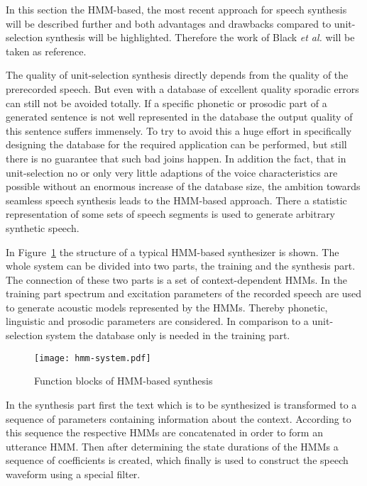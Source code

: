 In this section the \ac{HMM}-based, the most recent approach for speech synthesis will be described further and both advantages and drawbacks compared to unit-selection synthesis will be highlighted. Therefore the work of Black \textit{et al.} \cite{black:statistical} will be taken as reference.

The quality of unit-selection synthesis directly depends from the quality of the prerecorded speech. But even with a database of excellent quality sporadic errors can still not be avoided totally. If a specific phonetic or prosodic part of a generated sentence is not well represented in the database the output quality of this sentence suffers immensely. To try to avoid this a huge effort in specifically designing the database for the required application can be performed, but still there is no guarantee that such bad joins happen. In addition the fact, that in unit-selection no or only very little adaptions of the voice characteristics are possible without an enormous increase of the database size, the ambition towards seamless speech synthesis leads to the \ac{HMM}-based approach. There a statistic representation of some sets of speech segments is used to generate arbitrary synthetic speech.

In Figure~\ref{fig:hmm} the structure of a typical \ac{HMM}-based synthesizer is shown. The whole system can be divided into two parts, the training and the synthesis part. The connection of these two parts is a set of context-dependent \acp{HMM}. In the training part spectrum and excitation parameters %
of the recorded speech are used to generate acoustic models represented by the \acp{HMM}. Thereby phonetic, linguistic and prosodic parameters are considered. In comparison to a unit-selection system the database only is needed in the training part.

\begin{figure}[h]
	\texttt{[image: hmm-system.pdf]}
	\caption{Function blocks of \ac{HMM}-based synthesis \cite{black:statistical}}
	\label{fig:hmm}
\end{figure}

In the synthesis part first the text which is to be synthesized is transformed to a sequence of parameters containing information about the context. %
According to this sequence the respective \acp{HMM} are concatenated in order to form an utterance \ac{HMM}. Then after determining the state durations of the \acp{HMM} a sequence of coefficients is created, which finally is used to construct the speech waveform using a special filter. %

